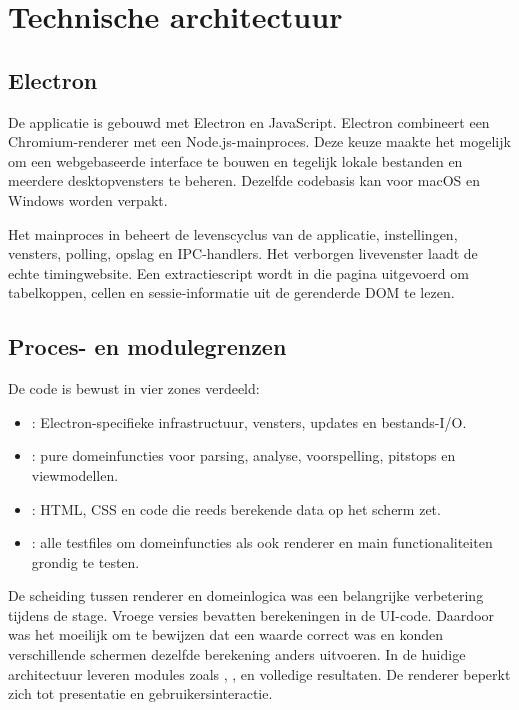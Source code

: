 
\chapter{Technische architectuur}
\label{chap:architectuur}


\section{Electron}
De applicatie is gebouwd met Electron en JavaScript. Electron combineert een Chromium-renderer met
een Node.js-mainproces. Deze keuze maakte het mogelijk om een webgebaseerde interface te bouwen en
tegelijk lokale bestanden en meerdere desktopvensters te beheren. Dezelfde
codebasis kan voor macOS en Windows worden verpakt.

Het mainproces in  beheert de levenscyclus van de applicatie, instellingen,
vensters, polling, opslag en IPC-handlers. Het verborgen livevenster laadt de echte timingwebsite.
Een extractiescript wordt in die pagina uitgevoerd om tabelkoppen, cellen en sessie-informatie uit
de gerenderde DOM te lezen.

\section{Proces- en modulegrenzen}
De code is bewust in vier zones verdeeld:

\begin{itemize}
  \item {}: Electron-specifieke infrastructuur, vensters, updates en bestands-I/O.
  \item {}: pure domeinfuncties voor parsing, analyse, voorspelling, pitstops en
        viewmodellen.
  \item {}: HTML, CSS en code die reeds berekende data op het scherm zet.
  \item {}: alle testfiles om domeinfuncties als ook renderer en main functionaliteiten grondig te testen.
\end{itemize}

De scheiding tussen renderer en domeinlogica was een belangrijke verbetering tijdens de stage.
Vroege versies bevatten berekeningen in de UI-code. Daardoor was het moeilijk om te bewijzen dat een
waarde correct was en konden verschillende schermen dezelfde berekening anders uitvoeren. In de
huidige architectuur leveren modules zoals , ,
 en  volledige resultaten. De renderer beperkt zich
tot presentatie en gebruikersinteractie.

